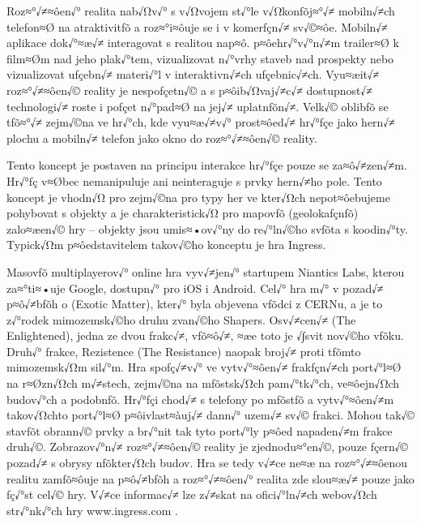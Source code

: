 \documentclass[twoside,12pt]{article}
\begin{document}
Roz≈°√≠≈ôen√° realita nab√Ωv√° s v√Ωvojem st√°le v√Ωkonƒõj≈°√≠ mobiln√≠ch telefon≈Ø na atraktivitƒõ a roz≈°i≈ôuje se i v komerƒçn√≠ sv√©≈ôe. Mobiln√≠ aplikace dok√°≈æ√≠ interagovat s realitou nap≈ô. p≈ôehr√°v√°n√≠m trailer≈Ø k film≈Øm nad jeho plak√°tem, vizualizovat n√°vrhy staveb nad prospekty nebo vizualizovat uƒçebn√≠ materi√°l v interaktivn√≠ch uƒçebnic√≠ch. Vyu≈æit√≠ roz≈°√≠≈ôen√© reality je nespoƒçetn√© a s p≈ôib√Ωvaj√≠c√≠ dostupnost√≠ technologi√≠ roste i poƒçet n√°pad≈Ø na jej√≠ uplatnƒõn√≠. Velk√© oblibƒõ se tƒõ≈°√≠ zejm√©na ve hr√°ch, kde vyu≈æ√≠v√° prost≈ôed√≠ hr√°ƒçe jako hern√≠ plochu a mobiln√≠ telefon jako okno do roz≈°√≠≈ôen√© reality.

Tento koncept je postaven na principu interakce hr√°ƒçe pouze se za≈ô√≠zen√≠m. Hr√°ƒç v≈Øbec nemanipuluje ani neinteraguje s prvky hern√≠ho pole. Tento koncept je vhodn√Ω pro zejm√©na pro typy her ve kter√Ωch nepot≈ôebujeme pohybovat s objekty a je charakteristick√Ω pro mapovƒõ (geolokaƒçnƒõ) zalo≈æen√© hry -- objekty jsou umis≈•ov√°ny do re√°ln√©ho svƒõta s koodin√°ty. Typick√Ωm p≈ôedstavitelem takov√©ho konceptu je hra Ingress.

%
% 

Masovƒõ multiplayerov√° online hra vyv√≠jen√° startupem Niantics Labs, kterou za≈°ti≈•uje Google, dostupn√° pro iOS i Android. Cel√° hra m√° v pozad√≠ p≈ô√≠bƒõh o  (Exotic Matter), kter√° byla objevena vƒõdci z CERNu, a je to z√°rodek mimozemsk√©ho druhu zvan√©ho Shapers. Osv√≠cen√≠ (The Enlightened), jedna ze dvou frakc√≠, vƒõ≈ô√≠, ≈æe toto je √∫svit nov√©ho vƒõku. Druh√° frakce, Rezistence (The Resistance) naopak broj√≠ proti tƒõmto mimozemsk√Ωm sil√°m. Hra spoƒç√≠v√° ve vytv√°≈ôen√≠ frakƒçn√≠ch port√°l≈Ø na r≈Øzn√Ωch m√≠stech, zejm√©na na mƒõstsk√Ωch pam√°tk√°ch, ve≈ôejn√Ωch budov√°ch a podobnƒõ. Hr√°ƒçi chod√≠ s telefony po mƒõstƒõ a vytv√°≈ôen√≠m takov√Ωchto port√°l≈Ø p≈ôivlast≈àuj√≠ dann√° uzem√≠ sv√© frakci. Mohou tak√© stavƒõt obrann√© prvky a br√°nit tak tyto port√°ly p≈ôed napaden√≠m frakce druh√©. Zobrazov√°n√≠ roz≈°√≠≈ôen√© reality je zjednodu≈°en√©, pouze ƒçern√© pozad√≠ s obrysy nƒõkter√Ωch budov. Hra se tedy v√≠ce ne≈æ na roz≈°√≠≈ôenou realitu zamƒõ≈ôuje na p≈ô√≠bƒõh a roz≈°√≠≈ôen√° realita zde slou≈æ√≠ pouze jako ƒç√°st cel√© hry. V√≠ce informac√≠ lze z√≠skat na ofici√°ln√≠ch webov√Ωch str√°nk√°ch hry www.ingress.com \cite{ingress}.
\end{document}
